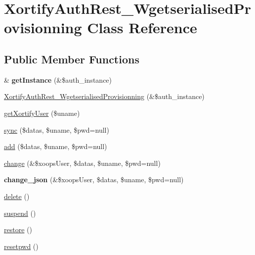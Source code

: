 \hypertarget{class_xortify_auth_rest___wgetserialised_provisionning}{\section{Xortify\-Auth\-Rest\-\_\-\-Wgetserialised\-Provisionning Class Reference}
\label{class_xortify_auth_rest___wgetserialised_provisionning}
}
\subsection*{Public Member Functions}
\begin{DoxyCompactItemize}
\item 
\hypertarget{class_xortify_auth_rest___wgetserialised_provisionning_ab42466d390f9554de5bc139643158521}{\& {\bfseries get\-Instance} (\&\$auth\-\_\-instance)}\label{class_xortify_auth_rest___wgetserialised_provisionning_ab42466d390f9554de5bc139643158521}

\item 
\hyperlink{class_xortify_auth_rest___wgetserialised_provisionning_aac0f9ca59b7d18b9c5aefc710c76b769}{Xortify\-Auth\-Rest\-\_\-\-Wgetserialised\-Provisionning} (\&\$auth\-\_\-instance)
\item 
\hyperlink{class_xortify_auth_rest___wgetserialised_provisionning_a115afbee94d3044d15998febf760fb8f}{get\-Xortify\-User} (\$uname)
\item 
\hyperlink{class_xortify_auth_rest___wgetserialised_provisionning_a57b231404e950666d8a25c10a863fe11}{sync} (\$datas, \$uname, \$pwd=null)
\item 
\hyperlink{class_xortify_auth_rest___wgetserialised_provisionning_ac017fe5dcfe84921d2f2184c6e85dd56}{add} (\$datas, \$uname, \$pwd=null)
\item 
\hyperlink{class_xortify_auth_rest___wgetserialised_provisionning_aa4b5d6b91c6cf911be1e37b7c094ecae}{change} (\&\$xoops\-User, \$datas, \$uname, \$pwd=null)
\item 
\hypertarget{class_xortify_auth_rest___wgetserialised_provisionning_aa6ce32090d5001554cb07154090ae542}{{\bfseries change\-\_\-json} (\&\$xoops\-User, \$datas, \$uname, \$pwd=null)}\label{class_xortify_auth_rest___wgetserialised_provisionning_aa6ce32090d5001554cb07154090ae542}

\item 
\hyperlink{class_xortify_auth_rest___wgetserialised_provisionning_a7d482a94487d3e59070d991c63ecdb1b}{delete} ()
\item 
\hyperlink{class_xortify_auth_rest___wgetserialised_provisionning_add2c950c717f9cc52dbf77009a9bb148}{suspend} ()
\item 
\hyperlink{class_xortify_auth_rest___wgetserialised_provisionning_a2c4745e8e34b4eafa4d9f6c5aa187945}{restore} ()
\item 
\hyperlink{class_xortify_auth_rest___wgetserialised_provisionning_af06f534b65373d7b82eab4ef417c11c5}{resetpwd} ()
\end{DoxyCompactItemize}
